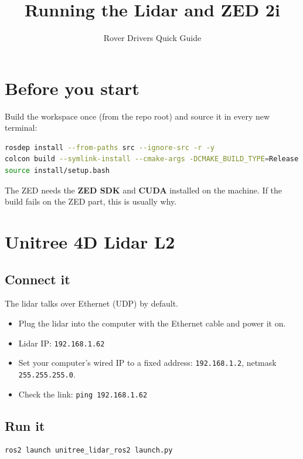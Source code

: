 \documentclass[11pt,a4paper]{article}
\title{Running the Lidar and ZED 2i}
\author{Rover Drivers Quick Guide}
\date{}
\begin{document}
\maketitle

\section{Before you start}

Build the workspace once (from the repo root) and source it in every new terminal:

\begin{lstlisting}[language=bash]
rosdep install --from-paths src --ignore-src -r -y
colcon build --symlink-install --cmake-args -DCMAKE_BUILD_TYPE=Release
source install/setup.bash
\end{lstlisting}

The ZED needs the \textbf{ZED SDK} and \textbf{CUDA} installed on the machine. If the build fails on the ZED part, this is usually why.

\section{Unitree 4D Lidar L2}

\subsection{Connect it}

The lidar talks over Ethernet (UDP) by default.

\begin{itemize}
  \item Plug the lidar into the computer with the Ethernet cable and power it on.
  \item Lidar IP: \texttt{192.168.1.62}
  \item Set your computer's wired IP to a fixed address: \texttt{192.168.1.2}, netmask \texttt{255.255.255.0}.
  \item Check the link: \texttt{ping 192.168.1.62}
\end{itemize}

\subsection{Run it}

\begin{lstlisting}[language=bash]
ros2 launch unitree_lidar_ros2 launch.py
\end{lstlisting}
\end{document}
